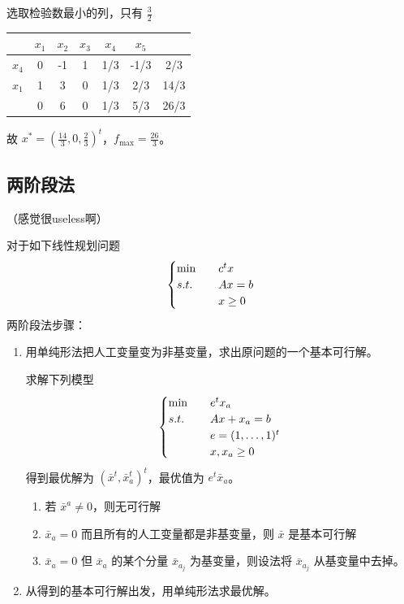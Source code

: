 \begin{example}
\begin{center}
        选取检验数最小的列，只有 $\frac{3}{2}$

        \begin{tabular}{c|ccccc|c}
            & $x_1$ & $x_2$ & $x_3$ & $x_4$ & $x_5$ & \\
            \hline
            $x_4$ & 0 & -1 & 1 & 1/3 & -1/3 & 2/3\\
            $x_1$ & 1 & 3 & 0 & 1/3 & 2/3 & 14/3\\
            \hline
             & 0 & 6 & 0 & 1/3 & 5/3 & 26/3
        \end{tabular}
    \end{center}
    故 $x^* = \left(\frac{14}{3}, 0, \frac{2}{3}\right)^t$，$f_{\max} = \frac{26}{3}$。
\end{example}

\subsection{两阶段法}
（感觉很useless啊）

对于如下线性规划问题
\[
    \begin{cases}
        \min \quad &c^tx\\
        s.t. \quad &Ax = b\\
        &x \ge 0
    \end{cases}    
\]
两阶段法步骤：
\begin{enumerate}
    \item 用单纯形法把人工变量变为非基变量，求出原问题的一个基本可行解。

    求解下列模型
    \[
        \begin{cases}
            \min \quad &e^tx_a\\
            s.t. \quad &Ax + x_a = b\\
            &e = (1, \dots, 1)^t\\
            &x, x_a \ge 0
        \end{cases}
    \]
    得到最优解为 $(\bar{x}^t, \bar{x}_a^t)^t$，最优值为 $e^t\bar{x}_a$。
    \begin{enumerate}
        \item 若 $\bar{x}^a \neq 0$，则无可行解
        \item $\bar{x}_a = 0$ 而且所有的人工变量都是非基变量，则 $\bar{x}$ 是基本可行解
        \item $\bar{x}_a = 0$ 但 $\bar{x}_a$ 的某个分量 $\bar{x}_{a_j}$ 为基变量，则设法将 $\bar{x}_{a_j}$ 从基变量中去掉。
    \end{enumerate}
    \item 从得到的基本可行解出发，用单纯形法求最优解。
\end{enumerate}

